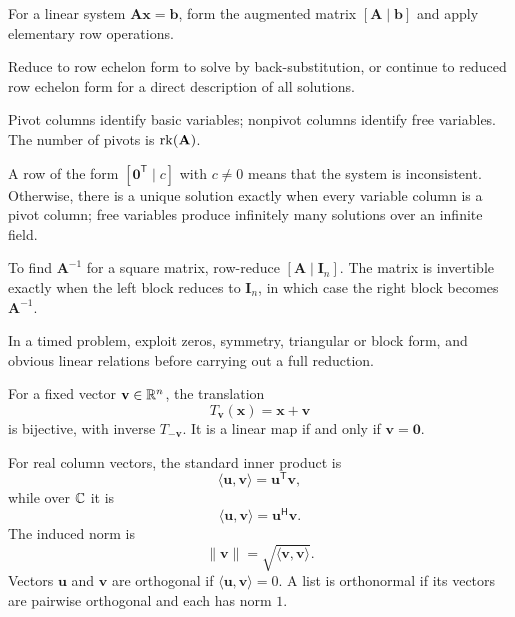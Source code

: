     \begin{algorithm}
        For a linear system $\mathbf{A}\mathbf{x}=\mathbf{b}$, form the
        augmented matrix $[\mathbf{A}\mid\mathbf{b}]$ and apply elementary row
        operations.
        \begin{bookitems}
            \item Reduce to row echelon form to solve by back-substitution, or
                  continue to reduced row echelon form for a direct description
                  of all solutions.
            \item Pivot columns identify basic variables; nonpivot columns
                  identify free variables. The number of pivots is
                  $\operatorname{rk}(\mathbf{A})$.
            \item A row of the form
                  $[\mathbf{0}^{\mathsf T}\mid c]$ with $c\neq0$ means that the
                  system is inconsistent. Otherwise, there is a unique solution
                  exactly when every variable column is a pivot column; free
                  variables produce infinitely many solutions over an infinite
                  field.
            \item To find $\mathbf{A}^{-1}$ for a square matrix, row-reduce
                  $[\mathbf{A}\mid\mathbf{I}_n]$. The matrix is invertible
                  exactly when the left block reduces to $\mathbf{I}_n$, in
                  which case the right block becomes $\mathbf{A}^{-1}$.
        \end{bookitems}
        In a timed problem, exploit zeros, symmetry, triangular or block form,
        and obvious linear relations before carrying out a full reduction.
    \end{algorithm}

    \begin{fact}
        For a fixed vector $\mathbf{v}\in\mathbb{R}^n$, the translation
        \[
            T_{\mathbf{v}}(\mathbf{x})
            =
            \mathbf{x}+\mathbf{v}
        \]
        is bijective, with inverse $T_{-\mathbf{v}}$. It is a linear map if and
        only if $\mathbf{v}=\mathbf{0}$.
    \end{fact}

    \begin{definition}
        For real column vectors, the standard inner product is
        \[
            \langle\mathbf{u},\mathbf{v}\rangle
            =
            \mathbf{u}^{\mathsf T}\mathbf{v},
        \]
        while over $\mathbb{C}$ it is
        \[
            \langle\mathbf{u},\mathbf{v}\rangle
            =
            \mathbf{u}^{\mathsf H}\mathbf{v}.
        \]
        The induced norm is
        \[
            \|\mathbf{v}\|=\sqrt{\langle\mathbf{v},\mathbf{v}\rangle}.
        \]
        Vectors $\mathbf{u}$ and $\mathbf{v}$ are orthogonal if
        $\langle\mathbf{u},\mathbf{v}\rangle=0$. A list is orthonormal if its
        vectors are pairwise orthogonal and each has norm $1$.
    \end{definition}

